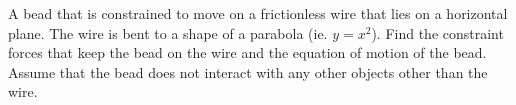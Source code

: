 \documentclass[graybox,envcountchap,sectrefs]{svmonoMuga}
\begin{document}
\begin{exercise}\label{ex:ParticleOnParabola}
A bead that is constrained to move on a frictionless wire that lies on a horizontal plane. The wire is bent to a shape of a parabola (ie. $y=x^2$). Find the constraint forces that keep the 
bead on the wire and the equation of motion of the bead. Assume that the bead does not interact with any other objects other than the wire. 
\end{exercise}






\end{document}

